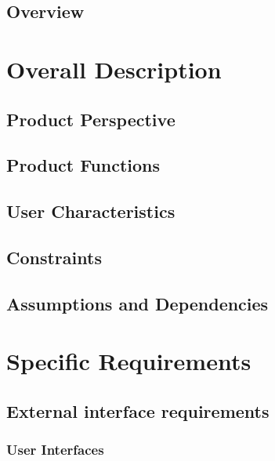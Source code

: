 \documentclass{scrreprt}
\begin{document}
\section{Overview}



\chapter{Overall Description}

\section{Product Perspective}



\section{Product Functions}



\section{User Characteristics}



\section{Constraints}



\section{Assumptions and Dependencies}



\chapter{Specific Requirements}

\section{External interface requirements}


\subsection{User Interfaces}
\end{document}
